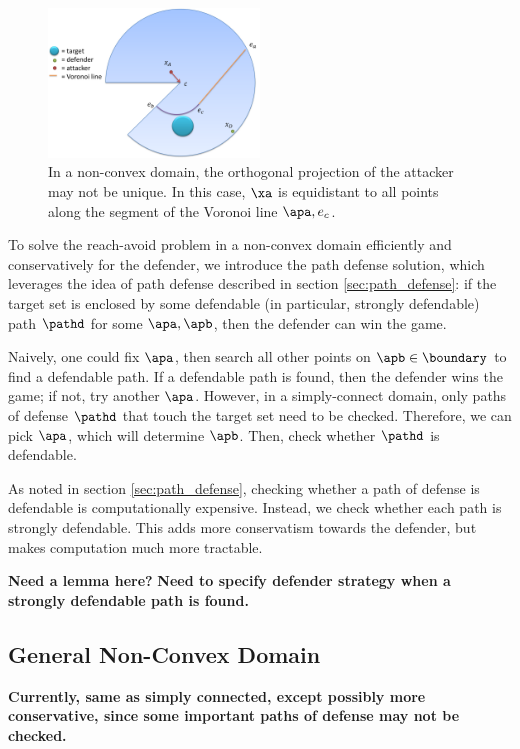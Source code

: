 \begin{figure}[h]
\centering
\includegraphics[width=0.5\textwidth]{"fig/non cvx domain 1"}
\caption{In a non-convex domain, the orthogonal projection of the attacker may not be unique. In this case, $\xa$ is equidistant to all points along the segment of the Voronoi line $\apa,e_c$.}
\label{fig:non_uniq_proj}
\end{figure}

To solve the reach-avoid problem in a non-convex domain efficiently and conservatively for the defender, we introduce the path defense solution, which leverages the idea of path defense described in section \ref{sec:path_defense}: if the target set is enclosed by some defendable (in particular, strongly defendable) path $\pathd$ for some $\apa,\apb$, then the defender can win the game. 

Naively, one could fix $\apa$, then search all other points on $\apb\in\boundary$ to find a defendable path. If a defendable path is found, then the defender wins the game; if not, try another $\apa$. However, in a simply-connect domain, only paths of defense $\pathd$ that touch the target set need to be checked. Therefore, we can pick $\apa$, which will determine $\apb$. Then, check whether $\pathd$ is defendable. 

As noted in section \ref{sec:path_defense}, checking whether a path of defense is defendable is computationally expensive. Instead, we check whether each path is strongly defendable. This adds more conservatism towards the defender, but makes computation much more tractable.

\textbf{Need a lemma here?}
\textbf{Need to specify defender strategy when a strongly defendable path is found.}

\subsection{General Non-Convex Domain}
\textbf{Currently, same as simply connected, except possibly more conservative, since some important paths of defense may not be checked.}

